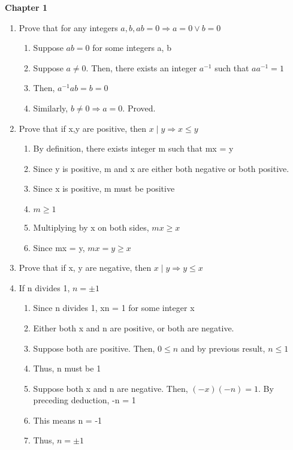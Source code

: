 \documentclass{article}
\begin{document}
\textbf{Chapter 1}
\begin{enumerate}
\item Prove that for any  integers $ a, b, ab = 0 \Rightarrow a = 0 \lor b = 0 $

\begin{enumerate}
\item Suppose $ ab = 0 $ for some integers a, b
\item Suppose $ a \neq 0. $ Then, there exists an integer $ a^{-1} $ such that $aa^{-1} = 1 $
\item Then, $a^{-1} a b = b = 0 $
\item Similarly, $ b \neq 0 \Rightarrow a = 0 $. Proved.
\end{enumerate}

\item Prove that if x,y are positive, then $ x \mid y \Rightarrow x \leq y $
\begin{enumerate}
\item By definition, there exists integer m such that mx = y
\item Since y is positive, m and x are either both negative or both positive.
\item Since x is positive, m must be positive
\item $ m \geq 1 $
\item Multiplying by x on both sides, $ mx \geq x $
\item Since mx = y, $ mx = y \geq x $
\end{enumerate}

\item Prove that if x, y are negative, then $ x \mid y \Rightarrow y \leq x $

\item If n divides 1, $ n = \pm 1 $
\begin{enumerate}
\item Since n divides 1, xn = 1 for some integer x
\item Either both x and n are positive, or both are negative.
\item Suppose both are positive. Then, $ 0 \leq n $ and by previous result, $ n \leq 1 $
\item Thus, n must be 1
\item Suppose both x and n are negative. Then, $ (-x)(-n) = 1 $. By preceding
deduction, -n = 1
\item This means n = -1
\item Thus, $ n = \pm 1 $
\end{enumerate}


\end{enumerate}
\end{document}

